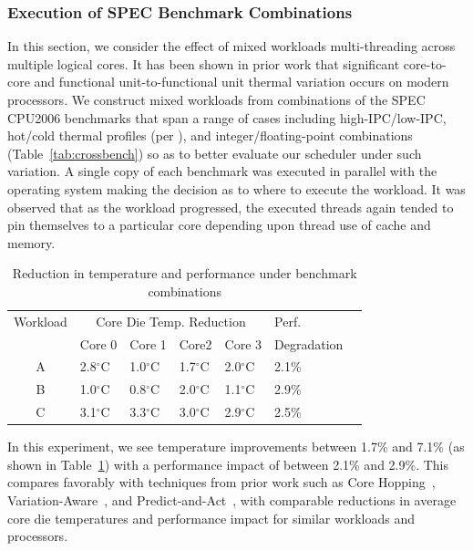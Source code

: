 \documentclass[times, 10pt,twocolumn]{IEEEtran}
\begin{document}
\subsubsection{Execution of SPEC Benchmark Combinations}
\label{sec:cross-funct-unit} 
In this section, we consider the effect of mixed workloads
multi-threading across multiple logical cores. It has been shown in
prior work \cite{Choi2007,Cher2011} that significant core-to-core and
functional unit-to-functional unit thermal variation occurs on modern
processors.  We construct mixed workloads from combinations of the SPEC
CPU2006 benchmarks that span a range of cases including
high-IPC/low-IPC, hot/cold thermal profiles (per \cite{Kursun2008}), and
integer/floating-point combinations (Table~\ref{tab:crossbench}) so as
to better evaluate our scheduler under such variation. A
single copy of each benchmark was executed in parallel with the
operating system making the decision as to where to execute the
workload.  It was observed that as the workload progressed, the executed
threads again tended to pin themselves to a particular core depending
upon thread use of cache and memory.

\begin{small}
\begin{table}[!bp] 
\centering
\caption{Reduction in temperature and performance under benchmark combinations}
\label{tab:mixwkload}
\begin{tabular}{cllllll} 
\hline
\hline
Workload & \multicolumn{4}{c}{Core Die Temp. Reduction}&Perf.\\
 & Core 0 & Core 1 & Core2  & Core 3 & Degradation \\
\hline
A & 2.8$^{\circ}$C & 1.0$^{\circ}$C & 1.7$^{\circ}$C & 2.0$^{\circ}$C & 2.1\% \\
B & 1.0$^{\circ}$C & 0.8$^{\circ}$C & 2.0$^{\circ}$C & 1.1$^{\circ}$C & 2.9\% \\
C & 3.1$^{\circ}$C & 3.3$^{\circ}$C & 3.0$^{\circ}$C & 2.9$^{\circ}$C & 2.5\% \\
\hline
\end{tabular}
\end{table}
\end{small} 

In this experiment, we see temperature improvements between
1.7\% and 7.1\% (as shown in Table~\ref{tab:mixwkload}) with a
performance impact of between 2.1\% and 2.9\%.  This compares favorably
with techniques from prior work such as Core Hopping~\cite{Choi2007},
Variation-Aware~\cite{Kursun2008}, and Predict-and-Act~\cite{Ayoub2009},
with comparable reductions in average core die temperatures and
performance impact for similar workloads and processors.
\end{document}
